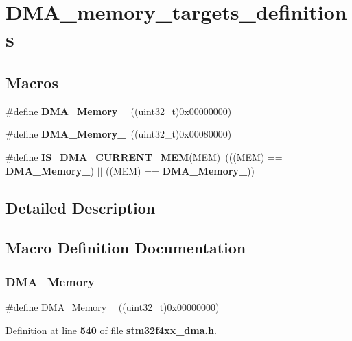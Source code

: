 \section{D\+M\+A\+\_\+memory\+\_\+targets\+\_\+definitions}
\label{group__DMA__memory__targets__definitions}
\subsection*{Macros}
\begin{DoxyCompactItemize}
\item 
\#define \textbf{ D\+M\+A\+\_\+\+Memory\+\_}~((uint32\+\_\+t)0x00000000)
\item 
\#define \textbf{ D\+M\+A\+\_\+\+Memory\+\_}~((uint32\+\_\+t)0x00080000)
\item 
\#define \textbf{ I\+S\+\_\+\+D\+M\+A\+\_\+\+C\+U\+R\+R\+E\+N\+T\+\_\+\+M\+EM}(M\+EM)~(((M\+EM) == \textbf{ D\+M\+A\+\_\+\+Memory\+\_}) $\vert$$\vert$ ((M\+EM) == \textbf{ D\+M\+A\+\_\+\+Memory\+\_}))
\end{DoxyCompactItemize}


\subsection{Detailed Description}


\subsection{Macro Definition Documentation}
\mbox{\label{group__DMA__memory__targets__definitions_gadb576bccef5f2fc65fe9b451033bdc95}} 
\subsubsection{D\+M\+A\+\_\+\+Memory\+\_}
{\footnotesize\ttfamily \#define D\+M\+A\+\_\+\+Memory\+\_~((uint32\+\_\+t)0x00000000)}



Definition at line \textbf{ 540} of file \textbf{ stm32f4xx\+\_\+dma.\+h}.

